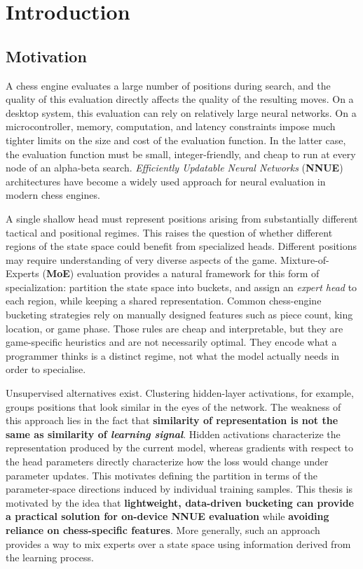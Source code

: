 
\chapter{Introduction}



\section{Motivation}

A chess engine evaluates a large number of positions during search, and the quality of this evaluation directly affects the quality of the resulting moves. On a desktop system, this evaluation can rely on relatively large neural networks. On a microcontroller, memory, computation, and latency constraints impose much tighter limits on the size and cost of the evaluation function. In the latter case, the evaluation function must be small, integer-friendly, and cheap to run at every node of an alpha-beta search. \emph{Efficiently Updatable Neural Networks} (\textbf{NNUE}) architectures have become a widely used approach for neural evaluation in modern chess engines.


A single shallow head must represent positions arising from substantially different tactical and positional regimes. This raises the question of whether different regions of the state space could benefit from specialized heads. Different positions may require understanding of very diverse aspects of the game. Mixture-of-Experts (\textbf{MoE}) evaluation provides a natural framework for this form of specialization: partition the state space into buckets, and assign an \emph{expert head} to each region, while keeping a shared representation. Common chess-engine bucketing strategies rely on manually designed features such as piece count, king location, or game phase. Those rules are cheap and interpretable, but they are game-specific heuristics and are not necessarily optimal. They encode what a programmer thinks is a distinct regime, not what the model actually needs in order to specialise.

Unsupervised alternatives exist. Clustering hidden-layer activations, for example, groups positions that look similar in the eyes of the network. The weakness of this approach lies in the fact that \textbf{similarity of representation is not the same as similarity of \emph{learning signal}}. Hidden activations characterize the representation produced by the current model, whereas gradients with respect to the head parameters directly characterize how the loss would change under parameter updates. This motivates defining the partition in terms of the parameter-space directions induced by individual training samples. This thesis is motivated by the idea that \textbf{lightweight, data-driven bucketing can provide a practical solution for on-device NNUE evaluation} while \textbf{avoiding reliance on chess-specific features}. More generally, such an approach provides a way to mix experts over a state space using information derived from the learning process.

